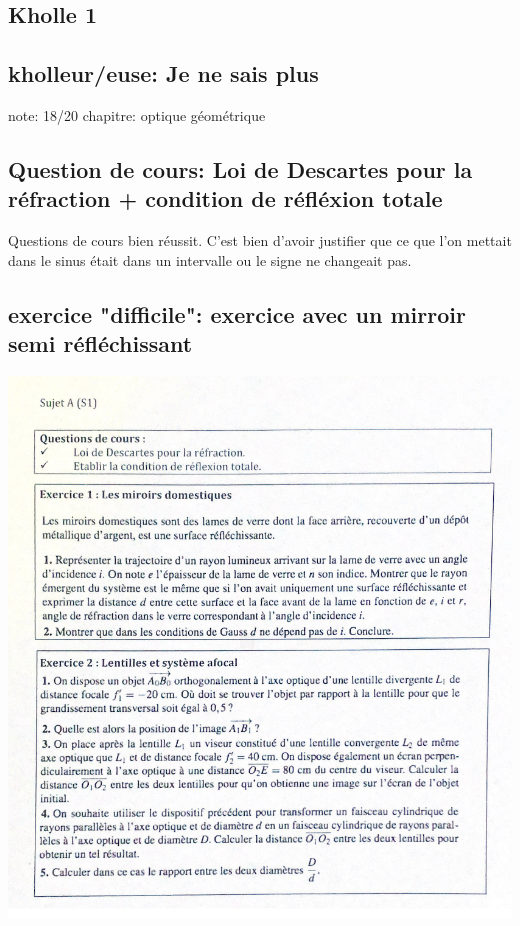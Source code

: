 \documentclass{article}
\begin{document}
\subsection{Kholle 1}
\subsection{kholleur/euse: Je ne sais plus}

note: 18/20
chapitre: optique géométrique

\subsection{Question de cours: Loi de Descartes pour la réfraction + condition de réfléxion totale}

Questions de cours bien réussit. C'est bien d'avoir justifier que ce que l'on mettait dans le sinus était dans un intervalle ou le signe ne changeait pas. \\

\subsection{exercice "difficile": exercice avec un mirroir semi réfléchissant}

\vspace{0.1cm}
\hspace{2.5cm}
\includegraphics[scale=0.4]{assets/physique/kholle1-1.png}
\end{document}
